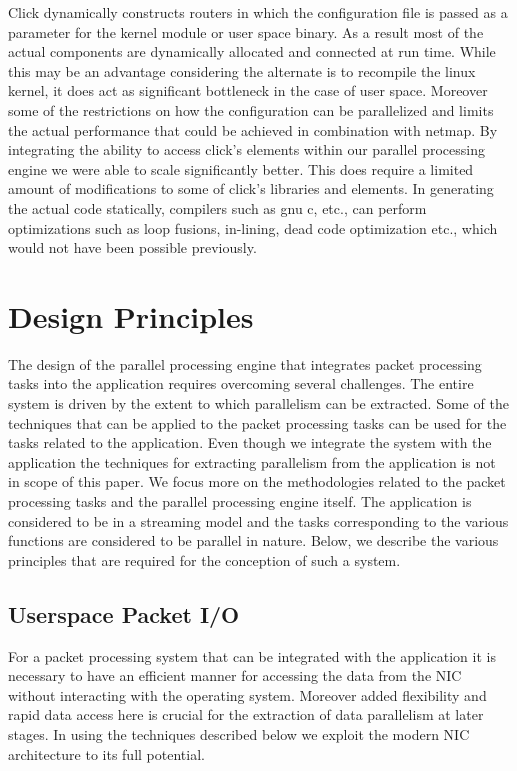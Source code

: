 \documentclass[conference]{IEEEtran}
\begin{document}
Click dynamically constructs routers in which the configuration file is passed as a parameter for the kernel module or user space binary. As a result most of the actual components are dynamically allocated and connected at run time. While this may be an advantage considering the alternate is to recompile the linux kernel, it does act as significant bottleneck in the case of user space. Moreover some of the restrictions on how the configuration can be parallelized and limits the actual performance that could be achieved in combination with netmap. By integrating the ability to access click's elements within our parallel processing engine we were able to scale significantly better. This does require a limited amount of modifications to some of click's libraries and elements. In generating the actual code statically, compilers such as gnu c, etc., can perform optimizations such as loop fusions, in-lining, dead code optimization etc., which would not have been possible previously.

\section{Design Principles}

The design of the parallel processing engine that integrates packet processing tasks into the application requires overcoming several challenges. The entire system is driven by the extent to which parallelism can be extracted. Some of the techniques that can be applied to the packet processing tasks can be used for the tasks related to the application. Even though we integrate the system with the application the techniques for extracting parallelism from the application is not in scope of this paper. We focus more on the methodologies related to the packet processing tasks and the parallel processing engine itself. The application is considered to be in a streaming model and the tasks corresponding to the various functions are considered to be parallel in nature. Below, we describe the various principles that are required for the conception of such a system. 

\subsection{Userspace Packet I/O}

For a packet processing system that can be integrated with the application it is necessary to have an efficient manner for accessing the data from the NIC without interacting with the operating system. Moreover added flexibility and rapid data access here is crucial for the extraction of data parallelism at later stages. In using the techniques described below we exploit the modern NIC architecture to its full potential.
\end{document}
